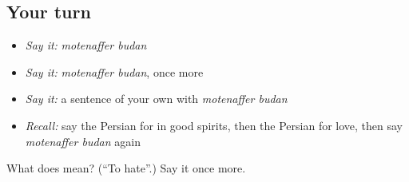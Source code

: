 \subsection*{Your turn}
\begin{itemize}
\raggedright
  \item \emph{Say it:} \emph{motenaffer budan}
  \item \emph{Say it:} \emph{motenaffer budan}, once more
  \item \emph{Say it:} a sentence of your own with \emph{motenaffer budan}
  \item \emph{Recall:} say the Persian for in good spirits, then the Persian for love, then say \emph{motenaffer budan} again
\end{itemize}

\begin{tcolorbox}[breakable,colback=teal!4,colframe=teal!35!black,title={Before you move on}]
What does   mean? (\textquotedblleft{}To hate\textquotedblright{}.) Say it once more.
\end{tcolorbox}
